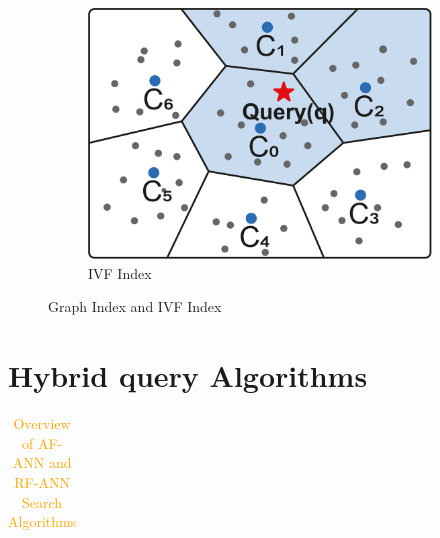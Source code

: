\documentclass[sigconf, nonacm]{acmart}
\begin{document}
{\begin{figure}
\begin{subfigure}{0.38\columnwidth}
			\includegraphics[width=\linewidth]{figures/ivf.pdf}
			\caption{IVF Index}
			\label{fig:ivf}
		\end{subfigure}
		
		
		\caption{Graph Index and IVF Index}
		
	\end{figure}
	
	
	\section{Hybrid query Algorithms}
	
	
	\renewcommand{\arraystretch}{0.9}
	\begin{table}[t]
		\centering
		
		\caption{\textcolor{orange}{Overview of AF-ANN and RF-ANN Search Algorithms}}
		\small
%			
%			
	\label{tab:compair_1}
	\begin{tabular}{|l|l|*{12}{c|}}
		\hline
		

\end{tabular}
\end{table}}
\end{document}
